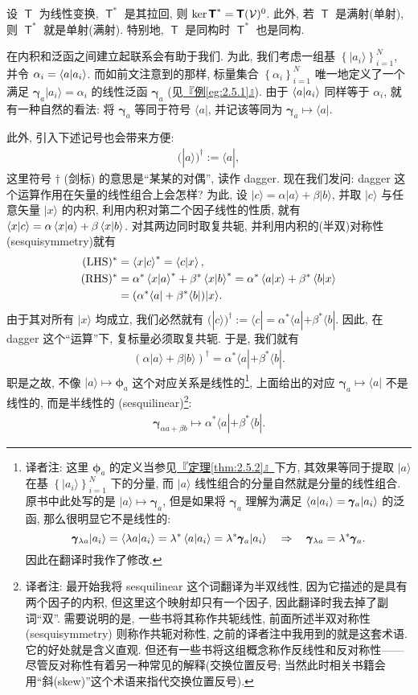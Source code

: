 \documentclass[lang=cn,zihao=-4,twoside,fontset=none]{textbook}
\newcommand{\bsf}[1]{{\mathop{\pmb{\mathsf{#1}}}}}
\def\EQ#1{\begin{equation}\begin{aligned}{}#1\end{aligned}\end{equation}}
\def\eq#1{\[\begin{aligned}{}#1\end{aligned}\]}
\newcommand{\secref}[1]{\hyperref[#1]{『\textnormal{\ref*{#1}}节』}}
\newcommand{\thmref}[1]{\hyperref[#1]{『定理\textnormal{\ref*{#1}}』}}
\newcommand{\egref}[1]{\hyperref[#1]{『例\textnormal{\ref*{#1}}』}}
\newcommand{\Set}[1]{\left\{#1\right\}}
\renewcommand{\ket}[1]{| #1 \rangle}
\renewcommand{\bra}[1]{\langle #1 |}
\begin{document}
\begin{prop}
    \label{prop:2.5.5}%
    设 $\bsf T$ 为线性变换, $\bsf{T}^*$ 是其拉回, 则 $\ker\bsf{T}^*=\bsf{T}(\mV)^0$. 此外, 若 $\bsf{T}$ 是满射(单射), 则 $\bsf{T}^*$ 就是单射(满射). 特别地, $\bsf{T}$ 是同构时 $\bsf{T}^*$ 也是同构.  
\end{prop}

在内积和泛函之间建立起联系会有助于我们. 为此, 我们考虑一组基 $\Set{\ket{a_i}}_{i=1}^N$, 并令 $\alpha_i=\braket{a }{a_i}$. 而如前文注意到的那样, 标量集合 $\Set{\alpha_i}_{i=1}^N$ 唯一地定义了一个
满足 $\pmb\gamma_a\ket{a_i}=\alpha_i$ 的线性泛函 $\pmb\gamma_a$ (见\egref{eg:2.5.1}). 由于 $\braket{a }{a_i}$ 同样等于 $\alpha_i$, 就有一种自然的看法: 将 $\pmb\gamma_a$ 等同于符号 $\bra{a}$, 并记该等同为 $\pmb\gamma_a\mapsto\bra{a}$.

此外, 引入下述记号\sidenote{这个记号的重要性会在\secref{sec:4.3}得以明晰.}也会带来方便:
\EQ{
    (\ket{a})^\dagger:= \bra{a}, \label{eq:2.26}
}
这里符号 $\dagger$ (剑标) 的意思是``某某的对偶'', 读作 dagger. 现在我们发问: dagger 这个运算作用在矢量的线性组合上会怎样? 为此, 设 $\ket{c}=\alpha\ket{a}+\beta\ket{b}$, 并取 $\ket{c}$ 与任意矢量 $\ket{x}$ 的内积, 利用内积对第二个因子线性的性质, 就有 $\braket{x }{c}=\alpha\braket{x }{a}+\beta\braket{x }{b}$. 对其两边同时取复共轭, 并利用内积的(半双)对称性(sesquisymmetry)就有 
\eq{
    (\mathrm{LHS})^*&=\braket{x }{c}^*=\braket{c }{x},\\
    (\mathrm{RHS})^*&=\alpha^*\braket{x }{a}^*+\beta^*\braket{x }{b}^*=\alpha^*\braket{a }{x}+\beta^*\braket{b }{x}\\
    &=(\alpha^*\bra{a}+\beta^*\bra{b})\ket{x}.
}
由于其对所有 $\ket{x}$ 均成立, 我们必然就有 $(\ket{c})^\dagger:=\bra{c}=\alpha^*\bra{a}+\beta^*\bra{b}$. 因此, 在 dagger 这个``运算''下, 复标量必须取复共轭. 于是, 我们就有 
\EQ{
    (\alpha\ket{a}+\beta\ket{b})^\dagger = \alpha^*\bra{a}+\beta^*\bra{b}. \label{eq:2.27}
}
职是之故, 不像 $\ket{a}\mapsto\pmb\phi_a$ 这个对应关系是线性的\footnote{译者注: 这里 $\pmb\phi_a$ 的定义当参见\thmref{thm:2.5.2}下方, 其效果等同于提取 $\ket{a}$ 在基 $\Set{\ket{a_i}}_{i=1}^N$ 下的分量, 而 $\ket{a}$ 线性组合的分量自然就是分量的线性组合. 原书中此处写的是 $\ket{a}\mapsto\pmb\gamma_a$, 但是如果将 $\pmb\gamma_a$ 理解为满足 $\braket{a}{a_i}=\pmb\gamma_a\ket{a_i}$ 的泛函, 那么很明显它不是线性的:
\[
\pmb\gamma_{\lambda a}\ket{a_i}=\braket{\lambda a}{a_i}=\lambda^*\braket{a }{a_i}=\lambda^*\pmb\gamma_{a}\ket{a_i}\quad\Rightarrow\quad\pmb\gamma_{\lambda a}=\lambda^*\pmb\gamma_a.
\]
因此在翻译时我作了修改.}, 上面给出的对应 $\pmb\gamma_a\mapsto\bra{a}$ 不是线性的, 而是半线性的 (sesquilinear)\footnote{译者注: 最开始我将 sesquilinear 这个词翻译为半双线性, 因为它描述的是具有两个因子的内积, 但这里这个映射却只有一个因子, 因此翻译时我去掉了副词``双''. 需要说明的是, 一些书将其称作共轭线性, 前面所述半双对称性(sesquisymmetry) 则称作共轭对称性, 之前的译者注中我用到的就是这套术语. 它的好处就是含义直观. 但还有一些书将这组概念称作反线性和反对称性——尽管反对称性有着另一种常见的解释(交换位置反号; 当然此时相关书籍会用``斜(skew)''这个术语来指代交换位置反号).}:
\eq{
    \pmb\gamma_{\alpha a+\beta b}\mapsto\alpha^*\bra{a}+\beta^*\bra{b}.
}
\end{document}
